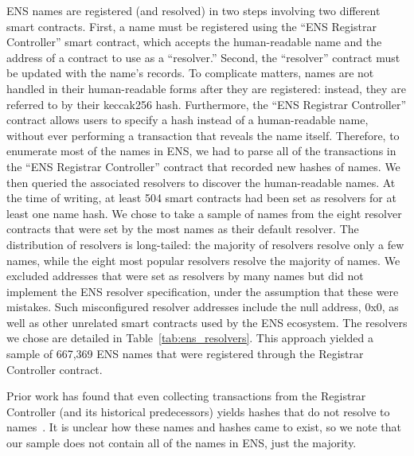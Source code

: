 ENS names are registered (and resolved) in two steps involving two different 
smart contracts. First, a name must be registered using the ``ENS Registrar 
Controller'' smart contract, which accepts the human-readable name and the 
address of a contract to use as a ``resolver.'' Second, the ``resolver'' 
contract must be updated with the name's records. To complicate matters, names 
are not handled in their human-readable forms after they are registered: 
instead, they are referred to by their keccak256 hash.  Furthermore, the ``ENS 
Registrar Controller'' contract allows users to specify a 
hash instead of a human-readable name, without ever performing a transaction 
that reveals the name itself. Therefore, to enumerate most of the names in ENS, 
we had to parse all of the transactions in the ``ENS Registrar Controller'' 
contract that recorded new hashes of names. We then queried the associated 
resolvers to discover the human-readable names. At the time of writing, at 
least 504 smart contracts had been set as resolvers for at least one name hash.
We chose to take a sample of names from the eight resolver contracts that were 
set by the most names as their default resolver. The distribution of resolvers 
is long-tailed: the majority of resolvers resolve only a few names, while the 
eight most popular resolvers resolve the majority of names. We excluded 
addresses that were set as resolvers by many names but did not implement the 
ENS resolver specification, under the assumption that these were mistakes. 
Such misconfigured resolver addresses include the null address, 0x0, as well as 
other unrelated smart contracts used by the ENS ecosystem. The resolvers we 
chose are detailed in Table~\ref{tab:ens_resolvers}. This approach yielded a 
sample of 667,369 ENS names that were registered through the Registrar 
Controller contract. 

Prior work has found that even collecting transactions from 
the Registrar Controller (and its historical 
predecessors) yields hashes that do not resolve to 
names~\cite{xia_ens_2022}. It is unclear how these names and 
hashes came to exist, so we note that our sample does not 
contain all of the names in ENS, just the majority.



